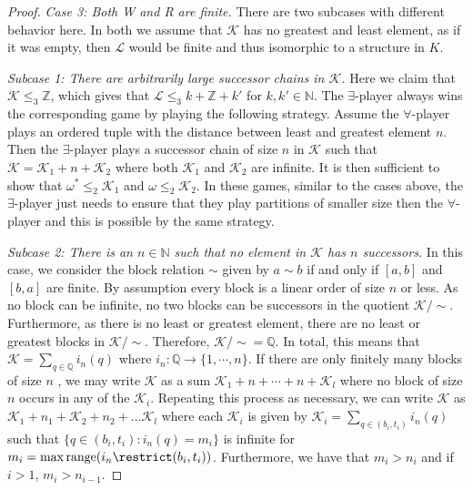 \documentclass{amsart}
\newcommand{\Q}{\mathbb{Q}}
\newcommand{\Z}{\mathbb{Z}}
\newcommand{\K}{\mathcal{K}}
\renewcommand{\L}{\mathcal{L}}
\begin{document}
\begin{proof}
\emph{Case 3: Both W and R are finite.}
There are two subcases with different behavior here.
In both we assume that $\K$ has no greatest and least element, as if it was
empty, then $\L$ would be finite and thus isomorphic to a structure in $K$.

\emph{Subcase 1: There are arbitrarily large successor chains in $\K$.} Here we
claim that $\K\leq_3\Z$, which gives that $\L\leq_3 k+\Z+k'$ for $k,k'\in\mathbb{N}$.
The $\exists$-player always wins the corresponding game by playing the following
strategy. Assume the $\forall$-player plays an ordered tuple with the distance
between least and greatest element $n$. Then the $\exists$-player plays a
successor chain of size $n$ in $\K$ such that $\K=\K_1+n+\K_2$ where both $\K_1$
and $\K_2$ are infinite. It is then sufficient to show that $\omega^*\leq_2
\K_1$ and $\omega\leq_2 \K_2$. In these games, similar to the cases above, the
$\exists$-player just needs to ensure that they play partitions of smaller size
then the $\forall$-player and this is possible by the same strategy.

\emph{Subcase 2: There is an $n\in\mathbb N$ such that no element in $\K$ has
$n$ successors.} In this case, we consider the block relation $\sim$ given by
$a\sim b$ if and only if $[a,b]$ and $[b,a]$ are finite. By assumption every
block is a linear order of size $n$ or less. As no block can be infinite, no two
blocks can be successors in the quotient $\K/{\sim}$. Furthermore, as there is
no least or greatest element, there are no least or greatest blocks in
$\K/{\sim}$. Therefore, $\K/{\sim}=\Q$. In total, this means that
$\K=\sum_{q\in\Q} i_n(q)$ where $i_n:\Q\to\{1,\cdots, n\}$. If there are only
finitely many blocks of size $n$ , we may write $\K$ as a sum
$\K_1+n+\cdots+n+\K_l$ where no block of size $n$ occurs in any of the $\K_i$.
Repeating this process as necessary, we can write $\K$ as $\K_1+n_1+\K_2+n_2+\dots
\K_l$ where each $\K_i$ is given by $\K_i=\sum_{q\in(b_i,t_i)} i_n(q)$ such
that $\{ q\in (b_i,t_i): i_n(q)=m_i\}$ is infinite for $m_i=\max{\text{range}(i_n\restrict (b_i,t_i))}$.
Furthermore, we have that $m_i>n_i$ and if $i>1$, $m_i>n_{i-1}$.


\end{proof}
\end{document}
